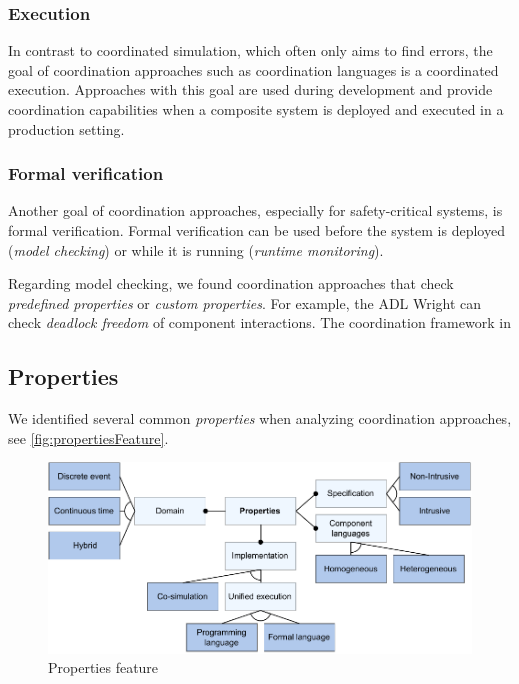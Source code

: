 \documentclass[runningheads]{llncs}
\begin{document}
\subsubsection{Execution} In contrast to coordinated simulation, which often only aims to find errors, the goal of coordination approaches such as coordination languages is a coordinated execution.
Approaches with this goal are used during development and provide coordination capabilities when a composite system is deployed and executed in a production setting.

\subsubsection{Formal verification} Another goal of coordination approaches, especially for safety-critical systems, is formal verification.
Formal verification can be used before the system is deployed (\textit{model checking}) or while it is running (\textit{runtime monitoring}).



Regarding model checking, we found coordination approaches that check \textit{predefined properties} or \textit{custom properties}.
For example, the ADL Wright \cite{allenFormalBasisArchitectural1997} can check \textit{deadlock freedom} of component interactions.
The coordination framework in \cite{krauterBehavioralConsistencyMultimodeling2023}

\subsection{Properties}
We identified several common \textit{properties} when analyzing coordination approaches, see \autoref{fig:propertiesFeature}.

\begin{figure}[ht]
	\centering
	\includegraphics[width=1\textwidth]{images/properties_feature}
	\caption{Properties feature}
	\label{fig:propertiesFeature}
\end{figure}
\end{document}
